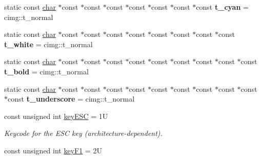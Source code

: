 \begin{DoxyCompactItemize}
\item 
\mbox{\label{namespacecimg__library__suffixed_1_1cimg_aa3b64102899199f405630a228a997de1}} 
static const \hyperlink{classchar}{char} $\ast$const $\ast$const $\ast$const $\ast$const $\ast$const $\ast$const $\ast$const {\bfseries t\+\_\+cyan} = cimg\+::t\+\_\+normal
\item 
\mbox{\label{namespacecimg__library__suffixed_1_1cimg_a160712252dfe1930fe9cf1a66b3456b9}} 
static const \hyperlink{classchar}{char} $\ast$const $\ast$const $\ast$const $\ast$const $\ast$const $\ast$const $\ast$const $\ast$const {\bfseries t\+\_\+white} = cimg\+::t\+\_\+normal
\item 
\mbox{\label{namespacecimg__library__suffixed_1_1cimg_a97105858deda52f9d407a0970cd04d50}} 
static const \hyperlink{classchar}{char} $\ast$const $\ast$const $\ast$const $\ast$const $\ast$const $\ast$const $\ast$const $\ast$const $\ast$const {\bfseries t\+\_\+bold} = cimg\+::t\+\_\+normal
\item 
\mbox{\label{namespacecimg__library__suffixed_1_1cimg_a9884d1ad480a98532c95e000e2d896d5}} 
static const \hyperlink{classchar}{char} $\ast$const $\ast$const $\ast$const $\ast$const $\ast$const $\ast$const $\ast$const $\ast$const $\ast$const $\ast$const {\bfseries t\+\_\+underscore} = cimg\+::t\+\_\+normal
\item 
\mbox{\label{namespacecimg__library__suffixed_1_1cimg_abaabb7beac6bae90502bd8378f7037f9}} 
const unsigned int \hyperlink{namespacecimg__library__suffixed_1_1cimg_abaabb7beac6bae90502bd8378f7037f9}{key\+E\+SC} = 1U
\begin{DoxyCompactList}\small\item\em Keycode for the {\ttfamily E\+SC} key (architecture-\/dependent). \end{DoxyCompactList}\item 
\mbox{\label{namespacecimg__library__suffixed_1_1cimg_ade4d16ade78e4de50ba4dcb6d01d45c8}} 
const unsigned int \hyperlink{namespacecimg__library__suffixed_1_1cimg_ade4d16ade78e4de50ba4dcb6d01d45c8}{key\+F1} = 2U

\end{DoxyCompactItemize}
